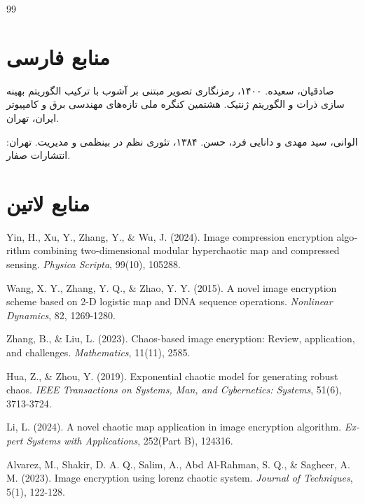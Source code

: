 
\begin{thebibliography}{99}

\section*{منابع فارسی}

 صادقیان، سعیده. ۱۴۰۰، رمزنگاری تصویر مبتنی بر آشوب با ترکیب الگوریتم بهینه سازی ذرات و الگوریتم ژنتیک. هشتمین کنگره ملی تازه‌های مهندسی برق و کامپیوتر ایران، تهران.

 الوانی، سید مهدی و دانایی فرد، حسن. ۱۳۸۴، تئوری نظم در بینظمی و مدیریت. تهران: انتشارات صفار.

\section*{منابع لاتین}

\begin{LTRbibitems}
\begin{latin}
 Yin, H., Xu, Y., Zhang, Y., \& Wu, J. (2024). Image compression encryption algorithm combining two-dimensional modular hyperchaotic map and compressed sensing. \textit{Physica Scripta}, 99(10), 105288.

 Wang, X. Y., Zhang, Y. Q., \& Zhao, Y. Y. (2015). A novel image encryption scheme based on 2-D logistic map and DNA sequence operations. \textit{Nonlinear Dynamics}, 82, 1269-1280.

 Zhang, B., \& Liu, L. (2023). Chaos-based image encryption: Review, application, and challenges. \textit{Mathematics}, 11(11), 2585.

 Hua, Z., \& Zhou, Y. (2019). Exponential chaotic model for generating robust chaos. \textit{IEEE Transactions on Systems, Man, and Cybernetics: Systems}, 51(6), 3713-3724.

 Li, L. (2024). A novel chaotic map application in image encryption algorithm. \textit{Expert Systems with Applications}, 252(Part B), 124316.

 Alvarez, M., Shakir, D. A. Q., Salim, A., Abd Al-Rahman, S. Q., \& Sagheer, A. M. (2023). Image encryption using lorenz chaotic system. \textit{Journal of Techniques}, 5(1), 122-128.


\end{latin}
\end{LTRbibitems}
\end{thebibliography}
